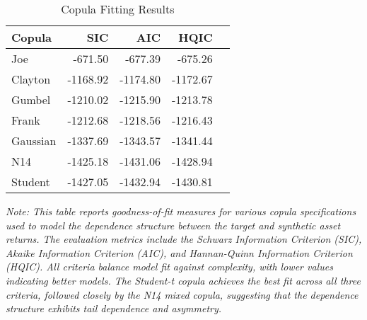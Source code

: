 \begin{table}[H]
\centering
\caption{Copula Fitting Results}
\label{tab:copula_fit}
\begin{tabular}{lrrrr}
\toprule
Copula & SIC & AIC & HQIC \\
\toprule
Joe & -671.50 & -677.39 & -675.26 \\
Clayton & -1168.92 & -1174.80 & -1172.67 \\
Gumbel & -1210.02 & -1215.90 & -1213.78 \\
Frank & -1212.68 & -1218.56 & -1216.43 \\
Gaussian & -1337.69 & -1343.57 & -1341.44 \\
N14 & -1425.18 & -1431.06 & -1428.94 \\
Student & -1427.05 & -1432.94 & -1430.81 \\
\bottomrule
\end{tabular}
\label{tab:copula_fits}
\vspace{0.5cm}
\begin{minipage}{\textwidth}
\setlength{\parindent}{0pt}
\small\textit{Note: 
This table reports goodness-of-fit measures for various copula specifications used to model the dependence structure between the target and synthetic asset returns. The evaluation metrics include the Schwarz Information Criterion (SIC), Akaike Information Criterion (AIC), and Hannan-Quinn Information Criterion (HQIC). All criteria balance model fit against complexity, with lower values indicating better models. The Student-t copula achieves the best fit across all three criteria, followed closely by the N14 mixed copula, suggesting that the dependence structure exhibits tail dependence and asymmetry.
}
\end{minipage}
\end{table}
